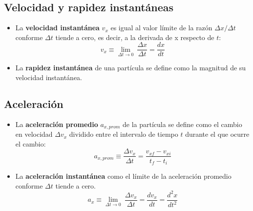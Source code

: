   \subsection{Velocidad y rapidez instantáneas}
    \begin{itemize}
      \item La \textbf{velocidad instantánea} $v_{x}$ es igual al valor límite de la razón $\Delta x / \Delta t$
      conforme $\Delta t$ tiende a cero, es decir, a la derivada de x respecto de $t$:
      \begin{equation*}
        v_{x} \equiv \lim_{\Delta t \rightarrow 0} \ \frac{\Delta x}{\Delta t} = \frac{dx}{dt}
      \end{equation*}

      \item La \textbf{rapidez instantánea} de una partícula se define como la magnitud de su velocidad instantánea.
    \end{itemize}

  \subsection{Aceleración}
    \begin{itemize}
      \item La \textbf{aceleración promedio} $a_{x,prom}$ de la partícula se define como el cambio en velocidad $\Delta
      v_{x}$ dividido entre el intervalo de tiempo $t$ durante el que ocurre el cambio:
      \begin{equation*}
        a_{x,prom} \equiv \frac{\Delta v_{x}}{\Delta t} = \frac{v_{xf} - v_{xi}}{t_{f} - t_{i}}
      \end{equation*}

      \item La \textbf{aceleración instantánea} como el límite de la aceleración promedio conforme $\Delta t$ tiende a
      cero.
      \begin{equation*}
        a_{x} \equiv \lim_{\Delta t \rightarrow 0} \ \frac{\Delta v_{x}}{\Delta t} = \frac{dv_{x}}{dt} =
        \frac{d^{2}x}{dt^{2}}
      \end{equation*}
    \end{itemize}

